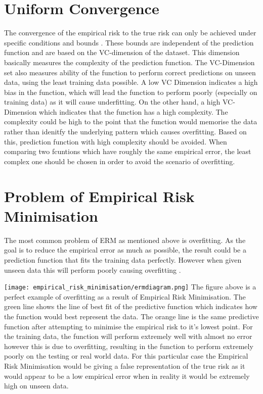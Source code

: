 \section{Uniform Convergence}
The convergence of the empirical risk to the true risk can only be achieved under specific conditions and bounds \citep{Clemencon2017}. These bounds are independent of the prediction function and are based on the VC-dimension of the dataset. This dimension basically measures the complexity of the prediction function. The VC-Dimension set also measures ability of the function to perform correct predictions on unseen data, using the least training data possible. A low VC Dimension indicates a high bias in the function, which will lead the function to perform poorly (especially on training data) as it will cause underfitting. On the other hand, a high VC-Dimension which indicates that the function has a high complexity. The complexity could be high to the point that the function would memorise the data rather than idenitfy the underlying pattern which causes overfitting. Based on this, prediction function with high complexity should be avoided. When comparing two fcuntions which have roughly the same empirical error, the least complex one should be chosen in order to avoid the scenario of overfitting.

\section{Problem of Empirical Risk Minimisation}
The most common problem of ERM as mentioned above is overfitting. As the goal is to reduce the empirical error as much as possible, the result could be a prediction function that fits the training data perfectly. However when given unseen data this will perform poorly causing overfitting \citep{UMachineLearning}. 

\texttt{[image: empirical\_risk\_minimisation/ermdiagram.png]}
The figure above is a perfect example of overfitting as a result of Empirical Risk Minimisation. The green line shows the line of best fit of the predictive function which indicates how the function would best represent the data. The orange line is the same predictive function after attempting to minimise the empirical risk to it's lowest point. For the training data, the function will perform extremely well with almost no error however this is due to overfitting, resulting in the function to perform extremely poorly on the testing or real world data. For this particular case the Empirical Risk Minimisation would be giving a false representation of the true risk as it would appear to be a low empirical error when in reality it would be extremely high on unseen data. 


